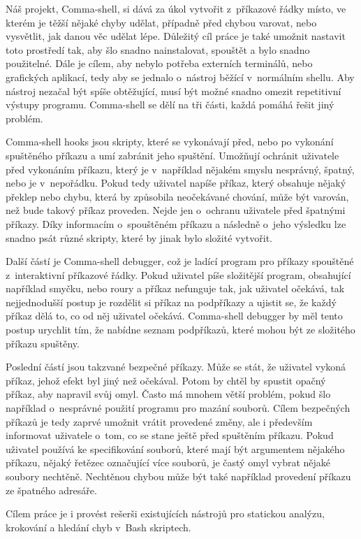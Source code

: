 \documentclass[thesis=M,czech]{FITthesis}[2012/06/26]
\begin{document}
\begin{introduction}
Náš projekt, Comma-shell, si dává za úkol vytvořit z~příkazové řádky místo, ve kterém je těžší nějaké chyby udělat, případně před chybou varovat, nebo vysvětlit, jak danou věc udělat lépe. Důležitý cíl práce je také umožnit nastavit toto prostředí tak, aby šlo snadno nainstalovat, spouštět a bylo snadno použitelné. Dále je cílem, aby nebylo potřeba externích terminálů, nebo grafických aplikací, tedy aby se jednalo o~nástroj běžící v~normálním shellu. Aby nástroj nezačal být spíše obtěžující, musí být možné snadno omezit repetitivní výstupy programu. Comma-shell se dělí na tři části, každá pomáhá řešit jiný problém.

Comma-shell hooks jsou skripty, které se vykonávají před, nebo po vykonání spuštěného příkazu a umí zabránit jeho spuštění. Umožňují ochránit uživatele před vykonáním příkazu, který je v~například nějakém smyslu nesprávný, špatný, nebo je v~nepořádku. Pokud tedy  uživatel napíše příkaz, který obsahuje nějaký překlep nebo chybu, která by způsobila neočekávané chování, může být varován, než bude takový příkaz proveden. Nejde jen o~ochranu uživatele před špatnými příkazy. Díky informacím o~spouštěném příkazu a následně o~jeho výsledku lze snadno psát různé skripty, které by jinak bylo složité vytvořit.

Další částí je Comma-shell debugger, což je ladící program pro příkazy spouštěné z~interaktivní příkazové řádky. Pokud uživatel píše složitější program, obsahující například smyčku, nebo roury a příkaz nefunguje tak, jak uživatel očekává, tak nejjednodušší postup je rozdělit si příkaz na podpříkazy a ujistit se, že každý příkaz dělá to, co od něj uživatel očekává. Comma-shell debugger by měl tento postup urychlit tím, že nabídne seznam podpříkazů, které mohou být ze složitého příkazu spuštěny.

Poslední částí jsou takzvané bezpečné příkazy. Může se stát, že uživatel vykoná příkaz, jehož efekt byl jiný než očekával. Potom by chtěl by spustit opačný příkaz, aby napravil svůj omyl. Často má mnohem větší problém, pokud šlo například o~nesprávné použití programu pro mazání souborů. Cílem bezpečných příkazů je tedy zaprvé umožnit vrátit provedené změny, ale i především informovat uživatele o~tom, co se stane ještě před spuštěním příkazu. Pokud uživatel používá ke specifikování souborů, které mají být argumentem nějakého příkazu, nějaký řetězec označující více souborů, je častý omyl vybrat nějaké soubory nechtěně. Nechtěnou chybou může být také například provedení příkazu ze špatného adresáře.

Cílem práce je i provést rešerši existujících nástrojů pro statickou analýzu, krokování a hledání chyb v~Bash skriptech.


\end{introduction}
\end{document}
